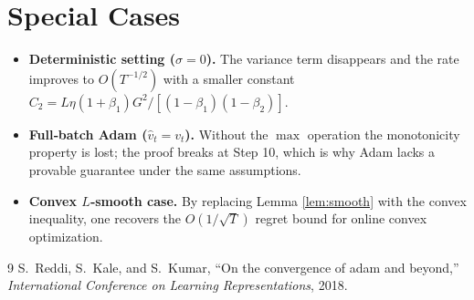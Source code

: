 \documentclass{article}
\begin{document}
\section*{Special Cases}
\begin{itemize}
\item \textbf{Deterministic setting ($\sigma=0$).} The variance term disappears and the rate improves to $O(T^{-1/2})$ with a smaller constant $C_{2}=L\eta(1+\beta_{1})G^{2}/[(1-\beta_{1})(1-\beta_{2})]$.
\item \textbf{Full‑batch Adam ($\hat v_{t}=v_{t}$).} Without the $\max$ operation the monotonicity property is lost; the proof breaks at Step 10, which is why Adam lacks a provable guarantee under the same assumptions.
\item \textbf{Convex $L$‑smooth case.} By replacing Lemma \ref{lem:smooth} with the convex inequality, one recovers the $O(1/\sqrt{T})$ regret bound for online convex optimization.
\end{itemize}

\begin{thebibliography}{9}
S.~Reddi, S.~Kale, and S.~Kumar, ``On the convergence of adam and beyond,'' \emph{International Conference on Learning Representations}, 2018.
\end{thebibliography}
\end{document}
